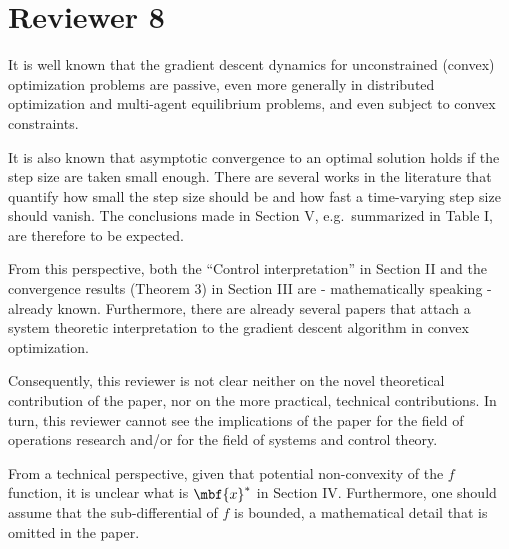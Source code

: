 \section*{Reviewer 8}\label{sec:reviewer8}
\renewcommand{\theequation}{R8.\arabic{equation}}
\setcounter{equation}{0}
\begin{rebuttal}
    {%
        It is well known that the gradient descent dynamics for unconstrained (convex) optimization problems are passive, even more generally in distributed optimization and multi-agent equilibrium problems, and even subject to convex constraints.
    }%
    {%
    }%
\end{rebuttal}
\begin{rebuttal}
    {%
        It is also known that asymptotic convergence to an optimal solution holds if the step size are taken small enough. There are several works in the literature that quantify how small the step size should be and how fast a time-varying step size should vanish. The conclusions made in Section V, e.g.\ summarized in Table I,  are therefore to be expected.
    }%
    {%
    }%
\end{rebuttal}
\begin{rebuttal}
    {%
    From this perspective, both the ``Control interpretation'' in Section II  and the convergence results (Theorem 3) in Section III are - mathematically speaking - already known. Furthermore, there are already several papers that attach a system theoretic interpretation to the gradient descent algorithm in convex optimization.
    }%
    {%
    }%
\end{rebuttal}
\begin{rebuttal}
    {%
    Consequently, this reviewer is not clear neither on the novel theoretical contribution of the paper, nor on the more practical, technical contributions. In turn, this reviewer cannot see the implications of the paper for the field of operations research and/or for the field of systems and control theory.
    }%
    {%
    }%
\end{rebuttal}
\begin{rebuttal}
    {%
    From a technical perspective, given that potential non-convexity of the $f$ function, it is unclear what is $\mbf{x}^{\ast}$ in Section IV\@. Furthermore, one should assume that the sub-differential of $f$ is bounded, a mathematical detail that is omitted in the paper.
    }%
    {%
    }%
\end{rebuttal}
